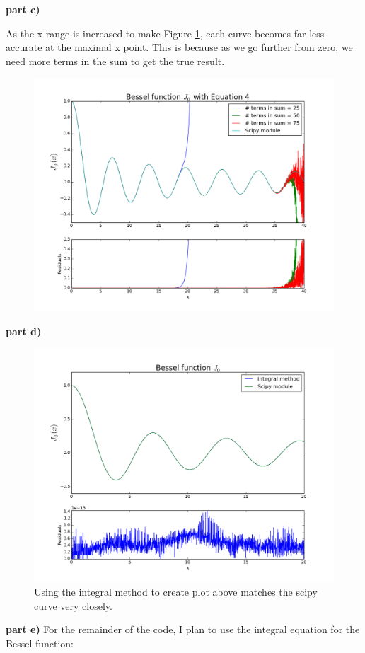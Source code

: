 \documentclass[a4paper,12pt]{article}
\begin{document}
\textbf{part c)}

As the x-range is increased to make Figure \ref{fig:q2c}, each curve becomes far less accurate at the maximal x point. This is because as we go further from zero, we need more terms in the sum to get the true result.

\begin{figure}[H]
\centering
\includegraphics[width = 0.8\linewidth]{indepq2c.png}
\caption{}
\label{fig:q2c}
\end{figure}

\textbf{part d)}

\begin{figure}[H]
\centering
\includegraphics[width = 0.8\linewidth]{indepq2d.png}
\caption{Using the integral method to create plot above matches the scipy curve very closely.}
\label{fig:q2d}
\end{figure}

\textbf{part e)} For the remainder of the code, I plan to use the integral equation for the Bessel function:
\end{document}
